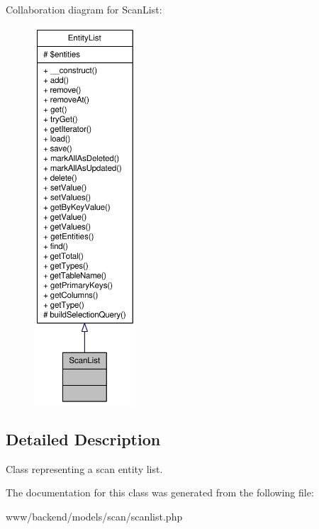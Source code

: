 Collaboration diagram for ScanList:\nopagebreak
\begin{figure}[H]
\begin{center}
\leavevmode
\includegraphics[height=400pt]{classScanList__coll__graph}
\end{center}
\end{figure}


\subsection{Detailed Description}
Class representing a scan entity list. 

The documentation for this class was generated from the following file:\begin{DoxyCompactItemize}
\item 
www/backend/models/scan/scanlist.php\end{DoxyCompactItemize}
